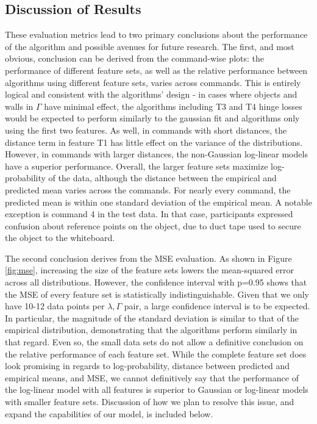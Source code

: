 \documentclass[12pt,letterpaper]{article}
\begin{document}
\subsection{Discussion of Results}

These evaluation metrics lead to two primary conclusions about the performance of the algorithm and possible avenues for future research. The first, and most obvious, conclusion can be derived from the command-wise plots: the performance of different feature sets, as well as the relative performance between algorithms using different feature sets, varies across commands. This is entirely logical and consistent with the algorithms' design - in cases where objects and walls in $\Gamma$ have minimal effect, the algorithms including T3 and T4 hinge losses would be expected to perform similarly to the gaussian fit and algorithms only using the first two features. As well, in commands with short distances, the distance term in feature T1 has little effect on the variance of the distributions. However, in commands with larger distances, the non-Gaussian log-linear models have a superior performance. Overall, the larger feature sets maximize log-probability of the data, although the distance between the empirical and predicted mean varies across the commands. For nearly every command, the predicted mean is within one standard deviation of the empirical mean. A notable exception is command 4 in the test data. In that case, participants expressed confusion about reference points on the object, due to duct tape used to secure the object to the whiteboard. 

The second conclusion derives from the MSE evaluation. As shown in Figure \ref{fig:mse}, increasing the size of the feature sets lowers the mean-squared error across all distributions. However, the confidence interval with p=0.95 shows that the MSE of every feature set is statistically indistinguishable. Given that we only have 10-12 data points per $\lambda, \Gamma$ pair, a large confidence interval is to be expected. In particular, the magnitude of the standard deviation is similar to that of the empirical distribution, demonstrating that the algorithms perform similarly in that regard. Even so, the small data sets do not allow a definitive conclusion on the relative performance of each feature set. While the complete feature set does look promising in regards to log-probability, distance between predicted and empirical means, and MSE, we cannot definitively say that the performance of the log-linear model with all features is superior to Gaussian or log-linear models with smaller feature sets. Discussion of how we plan to resolve this issue, and expand the capabilities of our model, is included below.
\end{document}
